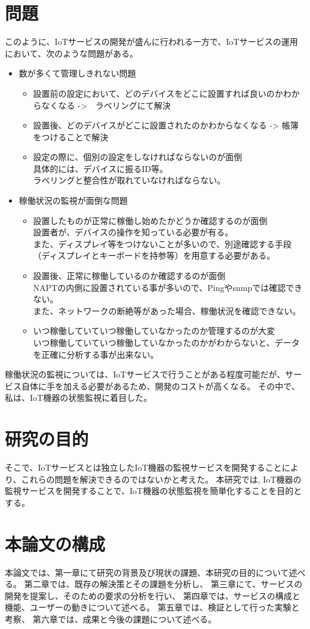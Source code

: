 \section{問題}
このように、IoTサービスの開発が盛んに行われる一方で、IoTサービスの運用において、次のような問題がある。
\begin{itemize}
	\item 数が多くて管理しきれない問題
	\begin{itemize}
		\item 設置前の設定において、どのデバイスをどこに設置すれば良いのかわからなくなる ->　ラベリングにて解決
		\item 設置後、どのデバイスがどこに設置されたのかわからなくなる -> 帳簿をつけることで解決
		\item 設定の際に、個別の設定をしなければならないのが面倒\\
			具体的には、デバイスに振るID等。\\
			ラベリングと整合性が取れていなければならない。
	\end{itemize}
	\item 稼働状況の監視が面倒な問題
	\begin{itemize}
		\item 設置したものが正常に稼働し始めたかどうか確認するのが面倒\\
			設置者が、デバイスの操作を知っている必要が有る。\\
			また、ディスプレイ等をつけないことが多いので、別途確認する手段（ディスプレイとキーボードを持参等）を用意する必要がある。
		\item 設置後、正常に稼働しているのか確認するのが面倒\\
			NAPTの内側に設置されている事が多いので、Pingやsnmpでは確認できない。\\
			また、ネットワークの断絶等があった場合、稼働状況を確認できない。
		\item いつ稼働していていつ稼働していなかったのか管理するのが大変\\
			いつ稼働していていつ稼働していなかったのかがわからないと、データを正確に分析する事が出来ない。
	\end{itemize}
\end{itemize}
稼働状況の監視については、IoTサービスで行うことがある程度可能だが、サービス自体に手を加える必要があるため、開発のコストが高くなる。
その中で、私は、IoT機器の状態監視に着目した。

\section{研究の目的}
そこで、IoTサービスとは独立したIoT機器の監視サービスを開発することにより、これらの問題を解決できるのではないかと考えた。
本研究では, IoT機器の監視サービスを開発することで、IoT機器の状態監視を簡単化することを目的とする。


\section{本論文の構成}
本論文では、第一章にて研究の背景及び現状の課題、本研究の目的について述べる。
第二章では、既存の解決策とその課題を分析し、
第三章にて、サービスの開発を提案し、そのための要求の分析を行い、
第四章では、サービスの構成と機能、ユーザーの動きについて述べる。
第五章では、検証として行った実験と考察、
第六章では、成果と今後の課題について述べる。

